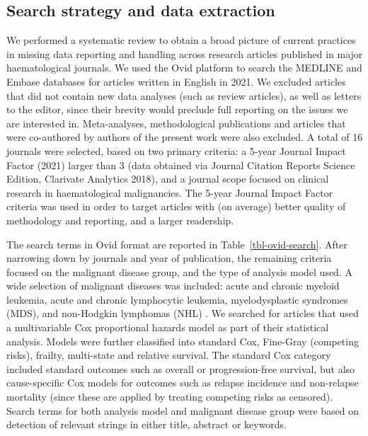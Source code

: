 \documentclass[
  letterpaper,
  paper=240mm:170mm,
  twoside=true,
  open=right,
  fontsize=10pt,
  pagesize=false,
  BCOR=15mm,
  DIV=14,
  headinclude=true,
  footinclude=false,
  headsepline=on]{scrbook}
\begin{document}
\subsection{Search strategy and data
extraction}\label{search-strategy-and-data-extraction}

We performed a systematic review to obtain a broad picture of current
practices in missing data reporting and handling across research
articles published in major haematological journals. We used the Ovid
platform to search the MEDLINE and Embase databases for articles written
in English in 2021. We excluded articles that did not contain new data
analyses (such as review articles), as well as letters to the editor,
since their brevity would preclude full reporting on the issues we are
interested in. Meta-analyses, methodological publications and articles
that were co-authored by authors of the present work were also excluded.
A total of 16 journals were selected, based on two primary criteria: a
5-year Journal Impact Factor (2021) larger than 3 (data obtained via
Journal Citation Reports Science Edition, Clarivate Analytics 2018), and
a journal scope focused on clinical research in haematological
malignancies. The 5-year Journal Impact Factor criteria was used in
order to target articles with (on average) better quality of methodology
and reporting, and a larger readership.

The search terms in Ovid format are reported in
Table~\ref{tbl-ovid-search}. After narrowing down by journals and year
of publication, the remaining criteria focused on the malignant disease
group, and the type of analysis model used. A wide selection of
malignant diseases was included: acute and chronic myeloid leukemia,
acute and chronic lymphocytic leukemia, myelodysplastic syndromes (MDS),
and non-Hodgkin lymphomas (NHL) . We searched for articles that used a
multivariable Cox proportional hazards model as part of their
statistical analysis. Models were further classified into standard Cox,
Fine-Gray (competing risks), frailty, multi-state and relative survival.
The standard Cox category included standard outcomes such as overall or
progression-free survival, but also cause-specific Cox models for
outcomes such as relapse incidence and non-relapse mortality (since
these are applied by treating competing risks as censored). Search terms
for both analysis model and malignant disease group were based on
detection of relevant strings in either title, abstract or keywords.
\end{document}
